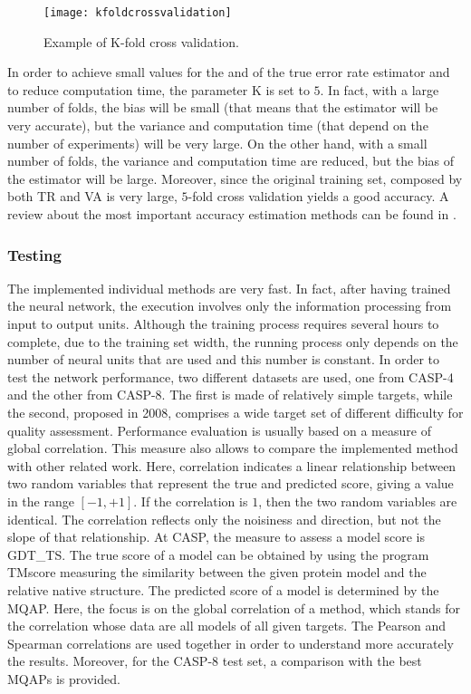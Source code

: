 \begin{figure}[tb]
	\begin{center}
		\texttt{[image: kfoldcrossvalidation]}
		\caption[K-fold cross validation]{Example of K-fold cross validation.}
		\label{fig:kfoldcrossvalidation}
	\end{center}
\end{figure}
In order to achieve small values for the  and  of the true error rate estimator and to reduce computation time, the parameter K is set to $5$. In fact, with a large number of folds, the bias will be small (that means that the estimator will be very accurate), but the variance and computation time (that depend on the number of experiments) will be very large. On the other hand, with a small number of folds, the variance and computation time are reduced, but the bias of the estimator will be large. Moreover, since the original training set, composed by both TR and VA is very large, $5$-fold cross validation yields a good accuracy. A review about the most important accuracy estimation methods can be found in \cite{Kohavi1995}.

\subsubsection{Testing}
\label{subsubsec:testing}
The implemented individual methods are very fast. In fact, after having trained the neural network, the execution involves only the information processing from input to output units. Although the training process requires several hours to complete, due to the training set width, the running process only depends on the number of neural units that are used and this number is constant. In order to test the network performance, two different datasets are used, one from CASP-4 and the other from CASP-8. The first is made of relatively simple targets, while the second, proposed in 2008, comprises a wide target set of different difficulty for quality assessment. Performance evaluation is usually based on a measure of global correlation. This measure also allows to compare the implemented method with other related work. Here, correlation indicates a linear relationship between two random variables that represent the true and predicted score, giving a value in the range $[-1,+1]$. If the correlation is $1$, then the two random variables are identical. The correlation reflects only the noisiness and direction, but not the slope of that relationship.
At CASP, the measure to assess a model score is GDT\_TS. The true score of a model can be obtained by using the program TMscore measuring the similarity between the given protein model and the relative native structure. The predicted score of a model is determined by the MQAP. Here, the focus is on the global correlation of a method, which stands for the correlation whose data are all models of all given targets. The Pearson and Spearman correlations are used together in order to understand more accurately the results. Moreover, for the CASP-8 test set, a comparison with the best MQAPs is provided.



